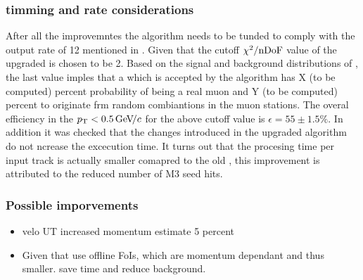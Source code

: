 \subsubsection{\hltone timming and rate considerations}
After all the improvemntes the \mvTTm algorithm needs to be tunded to comply with the \hltone output rate of 12
\khz mentioned in . Given that the cutoff $\chi^2/{\rm nDoF}$ value of the upgraded \mvTTm is chosen to be 2.
Based on the signal and background distributions of , the last value imples that a \veloTrack which
is accepted by the \mvTTm algorithm has {\color{red} X (to be computed)} percent probability of being
a real muon and {\color{red} Y (to be computed)} percent to originate frm random combiantions in the muon stations. The overal \mvTTm efficiency in the $\mbox{$p_{\rm T}$}<0.5{\mathrm{\,Ge\kern -0.1em V\!/}c}$
for the above cutoff value is $\epsilon = 55 \pm 1.5 \%$. In addition it was checked that the changes introduced in the upgraded \mvTTm algorithm
do not ncrease the excecution time. It turns out that the procesing time per input track is actually smaller comapred to
the old \mvm, this improvement is attributed to the reduced number of M3 seed hits.

\subsubsection{Possible imporvements}
\begin{itemize}
  \item velo UT increased momentum estimate 5 percent
  \item Given that use offline FoIs, which are momentum dependant and thus smaller. save time and reduce background.
\end{itemize}
